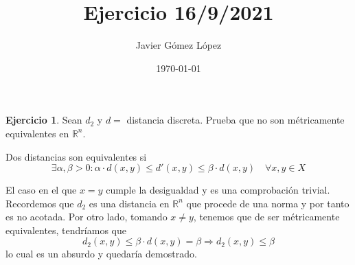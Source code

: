 \documentclass[a4paper, 12pt]{article}
\title{Ejercicio 16/9/2021}
\author{Javier Gómez López}
\date{\today}
\theoremstyle{definition}
\newtheorem{ej}{Ejercicio}
\begin{document}
\maketitle

\begin{ej}
Sean \(d_2\) y \(d = \) distancia discreta. Prueba que no son métricamente equivalentes en \(\mathbb{R}^n\).

Dos distancias son equivalentes si 
\begin{equation} \label{met_equivalentes}
\exists \alpha , \beta > 0 : \alpha \cdot d(x,y) \leq d'(x,y) \leq \beta \cdot d(x,y) \quad \forall x,y \in X
\end{equation}

El caso en el que \(x=y\) cumple la desigualdad y es una comprobación trivial. Recordemos que \(d_2\) es una distancia en \(\mathbb{R}^n\) que procede de una norma y por tanto es no acotada. Por otro lado, tomando \(x \neq y\), tenemos que de ser métricamente equivalentes, tendríamos que 
\[
	d_2 (x,y) \leq \beta \cdot d(x,y) = \beta \Rightarrow d_2(x,y) \leq \beta
\]
lo cual es un absurdo y quedaría demostrado.
\end{ej}

\bigskip
\end{document}
